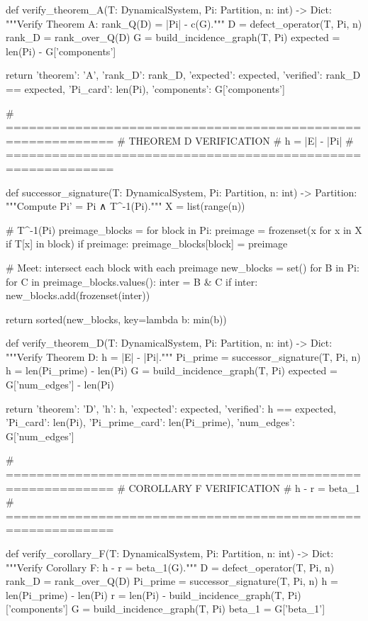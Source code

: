 def verify_theorem_A(T: DynamicalSystem, Pi: Partition, n: int) -> Dict:
    """Verify Theorem A: rank_Q(D) = |Pi| - c(G)."""
    D = defect_operator(T, Pi, n)
    rank_D = rank_over_Q(D)
    G = build_incidence_graph(T, Pi)
    expected = len(Pi) - G['components']
    
    return {
        'theorem': 'A',
        'rank_D': rank_D,
        'expected': expected,
        'verified': rank_D == expected,
        'Pi_card': len(Pi),
        'components': G['components']
    }

# ============================================================
# THEOREM D VERIFICATION
# h = |E| - |Pi|
# ============================================================

def successor_signature(T: DynamicalSystem, Pi: Partition, n: int) -> Partition:
    """Compute Pi' = Pi ∧ T^{-1}(Pi)."""
    X = list(range(n))
    
    # T^{-1}(Pi)
    preimage_blocks = {}
    for block in Pi:
        preimage = frozenset({x for x in X if T[x] in block})
        if preimage:
            preimage_blocks[block] = preimage
    
    # Meet: intersect each block with each preimage
    new_blocks = set()
    for B in Pi:
        for C in preimage_blocks.values():
            inter = B & C
            if inter:
                new_blocks.add(frozenset(inter))
    
    return sorted(new_blocks, key=lambda b: min(b))

def verify_theorem_D(T: DynamicalSystem, Pi: Partition, n: int) -> Dict:
    """Verify Theorem D: h = |E| - |Pi|."""
    Pi_prime = successor_signature(T, Pi, n)
    h = len(Pi_prime) - len(Pi)
    G = build_incidence_graph(T, Pi)
    expected = G['num_edges'] - len(Pi)
    
    return {
        'theorem': 'D',
        'h': h,
        'expected': expected,
        'verified': h == expected,
        'Pi_card': len(Pi),
        'Pi_prime_card': len(Pi_prime),
        'num_edges': G['num_edges']
    }

# ============================================================
# COROLLARY F VERIFICATION
# h - r = beta_1
# ============================================================

def verify_corollary_F(T: DynamicalSystem, Pi: Partition, n: int) -> Dict:
    """Verify Corollary F: h - r = beta_1(G)."""
    D = defect_operator(T, Pi, n)
    rank_D = rank_over_Q(D)
    Pi_prime = successor_signature(T, Pi, n)
    h = len(Pi_prime) - len(Pi)
    r = len(Pi) - build_incidence_graph(T, Pi)['components']
    G = build_incidence_graph(T, Pi)
    beta_1 = G['beta_1']
    

